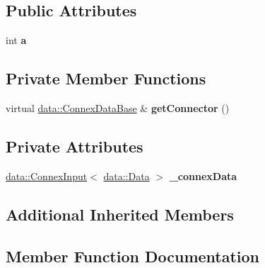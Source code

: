\subsection*{Public Attributes}
\begin{DoxyCompactItemize}
\item 
\mbox{\label{classfilter_1_1_algos_1_1_root_filter_acb1861d25f0ed3c74a0ccda5125cca09}} 
int {\bfseries a}
\end{DoxyCompactItemize}
\subsection*{Private Member Functions}
\begin{DoxyCompactItemize}
\item 
\mbox{\label{classfilter_1_1_algos_1_1_root_filter_a4aae899d9cd5f2960c2d1edf5f9da536}} 
virtual \hyperlink{classfilter_1_1data_1_1_connex_data_base}{data\+::\+Connex\+Data\+Base} \& {\bfseries get\+Connector} ()
\end{DoxyCompactItemize}
\subsection*{Private Attributes}
\begin{DoxyCompactItemize}
\item 
\mbox{\label{classfilter_1_1_algos_1_1_root_filter_a4a4ee29b13e79b8a12b200be63228e91}} 
\hyperlink{classfilter_1_1data_1_1_connex_input}{data\+::\+Connex\+Input}$<$ \hyperlink{classfilter_1_1data_1_1_data}{data\+::\+Data} $>$ {\bfseries \+\_\+connex\+Data}
\end{DoxyCompactItemize}
\subsection*{Additional Inherited Members}


\subsection{Member Function Documentation}
\mbox{\label{classfilter_1_1_algos_1_1_root_filter_a45d02535379a4b4b1cbb99180ba893e7}} 
